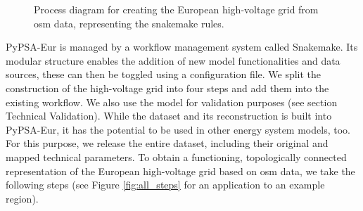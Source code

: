 \documentclass[fleqn,10pt]{wlscirep}
\let\autocite\cite
\begin{document}
\begin{figure}[h!]
    \centering
    \caption{Process diagram for creating the European high-voltage grid from \gls{osm} data, representing the snakemake rules.}
    \label{fig:osm_process}
\end{figure}

PyPSA-Eur is managed by a workflow management system called Snakemake. \autocite{molderSustainableDataAnalysis2021} Its modular structure enables the addition of new model functionalities and data sources, these can then be toggled using a configuration file. We split the construction of the high-voltage grid into four steps and add them into the existing workflow. We also use the model for validation purposes (see section Technical Validation). While the dataset and its reconstruction is built into PyPSA-Eur, it has the potential to be used in other energy system models, too. For this purpose, we release the entire dataset, including their original and mapped technical parameters. To obtain a functioning, topologically connected representation of the European high-voltage grid based on \gls{osm} data, we take the following steps (see Figure \ref{fig:all_steps} for an application to an example region).
\end{document}
